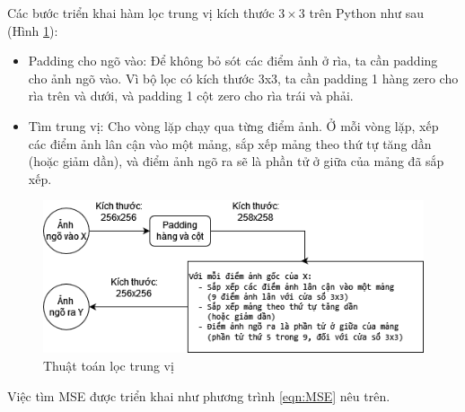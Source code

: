 Các bước triển khai hàm lọc trung vị kích thước $3 \times 3$ trên Python như sau (Hình \ref{fig:median_filtering_algorithm}):

\begin{itemize}
    \item Padding cho ngõ vào: Để không bỏ sót các điểm ảnh ở rìa, ta cần padding cho ảnh ngõ vào. Vì bộ lọc có kích thước 3x3, ta cần padding 1 hàng zero cho rìa trên và dưới, và padding 1 cột zero cho rìa trái và phải.

    \item Tìm trung vị: Cho vòng lặp chạy qua từng điểm ảnh. Ở mỗi vòng lặp, xếp các điểm ảnh lân cận vào một mảng, sắp xếp mảng theo thứ tự tăng dần (hoặc giảm dần), và điểm ảnh ngõ ra sẽ là phần tử ở giữa của mảng đã sắp xếp.
\end{itemize}

\begin{figure}[h]
    \centering
    \includegraphics[width=1\linewidth]{images/median_filtering_algorithm.png}
    \caption{Thuật toán lọc trung vị}
    \label{fig:median_filtering_algorithm}
\end{figure}

Việc tìm MSE được triển khai như phương trình \ref{eqn:MSE} nêu trên.

